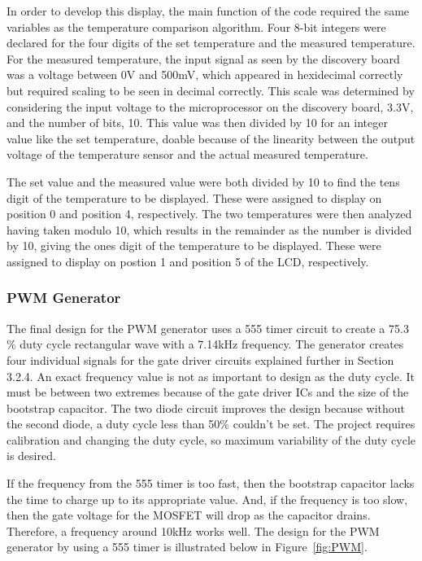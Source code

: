 \documentclass[11pt,letter]{article}
\begin{document}
In order to develop this display, the main function of the code required the same variables as the temperature comparison algorithm. Four 8-bit integers were declared for the four digits of the set temperature and the measured temperature. For the measured temperature, the input signal as seen by the discovery board was a voltage between 0V and 500mV, which appeared in hexidecimal correctly but required scaling to be seen in decimal correctly. This scale was determined by considering the input voltage to the microprocessor on the discovery board, 3.3V, and the number of bits, 10. This value was then divided by 10 for an integer value like the set temperature, doable because of the linearity between the output voltage of the temperature sensor and the actual measured temperature.

The set value and the measured value were both divided by 10 to find the tens digit of the temperature to be displayed. These were assigned to display on position 0 and position 4, respectively. The two temperatures were then analyzed having taken modulo 10, which results in the remainder as the number is divided by 10, giving the ones digit of the temperature to be displayed. These were assigned to display on postion 1 and position 5 of the LCD, respectively. 

\subsubsection{PWM Generator}

The final design for the PWM generator uses a 555 timer circuit to create a 75.3$\%$ duty cycle rectangular wave with a 7.14kHz frequency. The generator creates four individual signals for the gate driver circuits explained further in Section 3.2.4. An exact frequency value is not as important to design as the duty cycle. It must be between two extremes because of the gate driver ICs and the size of the bootstrap capacitor. The two diode circuit improves the design because without the second diode, a duty cycle less than 50$\%$ couldn't be set. The project requires calibration and changing the duty cycle, so maximum variability of the duty cycle is desired.

If the frequency from the 555 timer is too fast, then the bootstrap capacitor lacks the time to charge up to its appropriate value. And, if the frequency is too slow, then the gate voltage for the MOSFET will drop as the capacitor drains. Therefore, a frequency around 10kHz works well. The design for the PWM generator by using a 555 timer is illustrated below in Figure~\ref{fig:PWM}.
\end{document}
